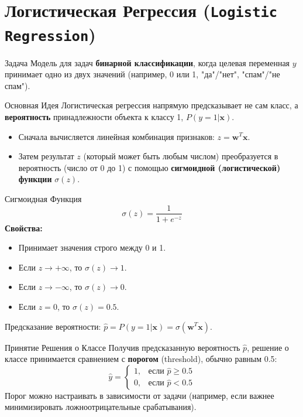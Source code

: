 \section{Логистическая Регрессия (\texttt{Logistic Regression})}

\begin{textbox}{Задача}
    Модель для задач \textbf{бинарной классификации}, когда целевая переменная $y$ принимает одно из двух значений (например, 0 или 1, "да"/"нет", "спам"/"не спам").
\end{textbox}

\begin{myblock}{Основная Идея}
    Логистическая регрессия напрямую предсказывает не сам класс, а \textbf{вероятность} принадлежности объекта к классу 1, $P(y=1 | \mathbf{x})$.
    \begin{itemize}[nosep, leftmargin=*]
        \item Сначала вычисляется линейная комбинация признаков: $z = \mathbf{w}^T \mathbf{x}$.
        \item Затем результат $z$ (который может быть любым числом) преобразуется в вероятность (число от 0 до 1) с помощью \textbf{сигмоидной (логистической) функции} $\sigma(z)$.
    \end{itemize}
\end{myblock}

\begin{myblock}{Сигмоидная Функция}
    \[ \sigma(z) = \frac{1}{1 + e^{-z}} \]
    \textbf{Свойства:}
    \begin{itemize}[nosep, leftmargin=*]
        \item Принимает значения строго между 0 и 1.
        \item Если $z \to +\infty$, то $\sigma(z) \to 1$.
        \item Если $z \to -\infty$, то $\sigma(z) \to 0$.
        \item Если $z = 0$, то $\sigma(z) = 0.5$.
    \end{itemize}
    Предсказание вероятности: $\hat{p} = P(y=1 | \mathbf{x}) = \sigma(\mathbf{w}^T \mathbf{x})$.
\end{myblock}

\begin{textbox}{Принятие Решения о Классе}
    Получив предсказанную вероятность $\hat{p}$, решение о классе принимается сравнением с \textbf{порогом} (threshold), обычно равным 0.5:
    \[ \hat{y} =
       \begin{cases}
           1, & \text{если } \hat{p} \ge 0.5 \\
           0, & \text{если } \hat{p} < 0.5
       \end{cases}
    \]
    Порог можно настраивать в зависимости от задачи (например, если важнее минимизировать ложноотрицательные срабатывания).
\end{textbox}

